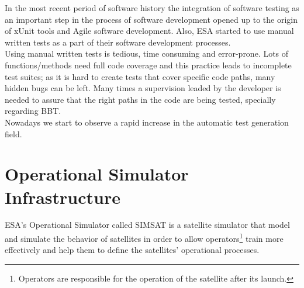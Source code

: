 In the most recent period of software history the integration of
software testing as an important step in the process of
software development opened up to the origin of xUnit\cite{xunit}
tools and Agile software development.
Also, \ac{ESA} started to use manual written tests as a part of their
software development processes.\\
Using  manual written tests is tedious, time consuming and error-prone.
Lots of functions/methods need full code coverage and this practice
leads to incomplete test suites;
as it is hard to create tests that cover specific code paths, many
hidden bugs can be left.
Many times a supervision leaded by the developer
is needed to assure that the right paths in the code are being tested,
specially regarding \ac{BBT}.\\
Nowadays we start to observe a rapid increase in the automatic test
generation field.

\section{Operational Simulator Infrastructure}
\ac{ESA}'s Operational Simulator called \ac{SIMSAT}
is a satellite simulator that model and simulate
the behavior of satellites in order to allow operators\footnote{Operators are responsible for the operation of the satellite after its launch.} train more effectively 
and help them to define the satellites' operational processes.

